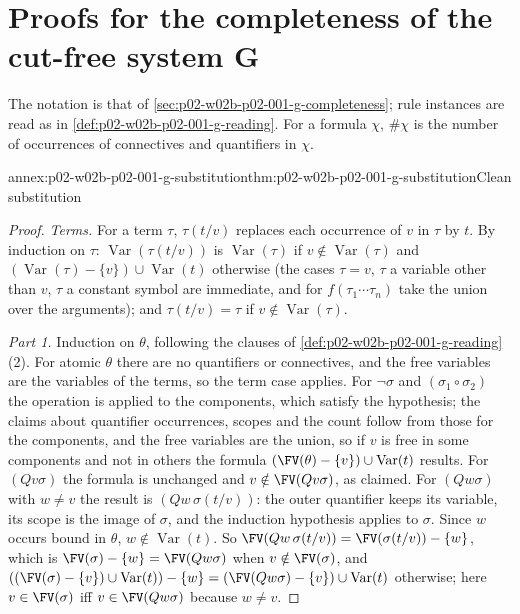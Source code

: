 \section{Proofs for the completeness of the cut-free system G}
\label{sec:annex-p02-w02b-p02-001-g-completeness}

The notation is that of \cref{sec:p02-w02b-p02-001-g-completeness}; rule
instances are read as in \cref{def:p02-w02b-p02-001-g-reading}.  For a
formula \(\chi\), \(\#\chi\) is the number of occurrences of connectives and
quantifiers in \(\chi\).

\begin{annexitem}{annex:p02-w02b-p02-001-g-substitution}{thm:p02-w02b-p02-001-g-substitution}{Clean substitution}
\begin{proof}
\emph{Terms.}  For a term \(\tau\), \(\tau(t/v)\) replaces each occurrence
of \(v\) in \(\tau\) by \(t\).  By induction on \(\tau\):
\(\operatorname{Var}(\tau(t/v))\) is \(\operatorname{Var}(\tau)\) if
\(v\notin\operatorname{Var}(\tau)\) and
\((\operatorname{Var}(\tau)-\{v\})\cup\operatorname{Var}(t)\) otherwise
(the cases \(\tau=v\), \(\tau\) a variable other than \(v\), \(\tau\) a
constant symbol are immediate, and for \(f(\tau_1\cdots\tau_n)\) take the
union over the arguments); and \(\tau(t/v)=\tau\) if
\(v\notin\operatorname{Var}(\tau)\).

\emph{Part 1.}  Induction on \(\theta\), following the clauses of
\cref{def:p02-w02b-p02-001-g-reading}(2).  For atomic \(\theta\) there are
no quantifiers or connectives, and the free variables are the variables of
the terms, so the term case applies.  For \(\neg\sigma\) and
\((\sigma_1\circ\sigma_2)\) the operation is applied to the components,
which satisfy the hypothesis; the claims about quantifier occurrences,
scopes and the count follow from those for the components, and the free
variables are the union, so if \(v\) is free in some components and not in
others the formula
\((\FV(\theta)-\{v\})\cup\operatorname{Var}(t)\) results.  For
\((Qv\sigma)\) the formula is unchanged and \(v\notin\FV(Qv\sigma)\), as
claimed.  For \((Qw\sigma)\) with \(w\neq v\) the result is
\((Qw\,\sigma(t/v))\): the outer quantifier keeps its variable, its scope is
the image of \(\sigma\), and the induction hypothesis applies to \(\sigma\).
Since \(w\) occurs bound in \(\theta\), \(w\notin\operatorname{Var}(t)\).
So \(\FV(Qw\,\sigma(t/v))=\FV(\sigma(t/v))-\{w\}\), which is
\(\FV(\sigma)-\{w\}=\FV(Qw\sigma)\) when \(v\notin\FV(\sigma)\), and
\(((\FV(\sigma)-\{v\})\cup\operatorname{Var}(t))-\{w\}
=(\FV(Qw\sigma)-\{v\})\cup\operatorname{Var}(t)\) otherwise; here
\(v\in\FV(\sigma)\) iff \(v\in\FV(Qw\sigma)\) because \(w\neq v\).


\end{proof}
\end{annexitem}
